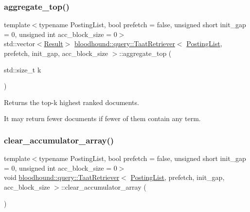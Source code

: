 \subsubsection{\texorpdfstring{aggregate\+\_\+top()}{aggregate\_top()}}
{\footnotesize\ttfamily template$<$typename Posting\+List, bool prefetch = false, unsigned short init\+\_\+gap = 0, unsigned int acc\+\_\+block\+\_\+size = 0$>$ \\
std\+::vector$<$\hyperlink{structbloodhound_1_1query_1_1Result}{Result}$>$ \hyperlink{classbloodhound_1_1query_1_1TaatRetriever}{bloodhound\+::query\+::\+Taat\+Retriever}$<$ \hyperlink{classbloodhound_1_1PostingList}{Posting\+List}, prefetch, init\+\_\+gap, acc\+\_\+block\+\_\+size $>$\+::aggregate\+\_\+top (\begin{DoxyParamCaption}\item[{std\+::size\+\_\+t}]{k }\end{DoxyParamCaption})\hspace{0.3cm}{\ttfamily [inline]}}

Returns the top-\/k highest ranked documents.

It may return fewer documents if fewer of them contain any term. \mbox{\label{classbloodhound_1_1query_1_1TaatRetriever_a6fedf448e3d9394ecaa787bf60a9cb84}} 
\subsubsection{\texorpdfstring{clear\+\_\+accumulator\+\_\+array()}{clear\_accumulator\_array()}}
{\footnotesize\ttfamily template$<$typename Posting\+List, bool prefetch = false, unsigned short init\+\_\+gap = 0, unsigned int acc\+\_\+block\+\_\+size = 0$>$ \\
void \hyperlink{classbloodhound_1_1query_1_1TaatRetriever}{bloodhound\+::query\+::\+Taat\+Retriever}$<$ \hyperlink{classbloodhound_1_1PostingList}{Posting\+List}, prefetch, init\+\_\+gap, acc\+\_\+block\+\_\+size $>$\+::clear\+\_\+accumulator\+\_\+array (\begin{DoxyParamCaption}{ }\end{DoxyParamCaption})\hspace{0.3cm}{\ttfamily [inline]}}



